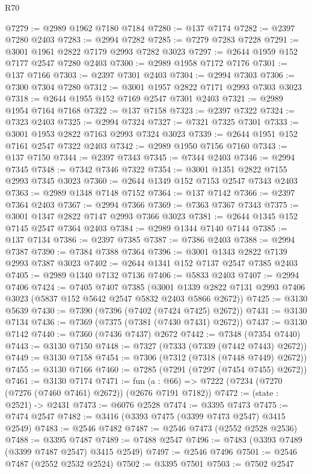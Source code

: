 \begin{lexlean}{R70}
\begin{coremodule}
@7279 := @2989 @1962 @7180 @7184
@7280 := @137 @7174
@7282 := @2397 @7280 @2403
@7283 := @2994 @7282
@7285 := @7279 @7283 @7228
@7291 := @3001 @1961 @2822 @7179 @2993 @7282 @3023
@7297 := @2644 @1959 @152 @7177 @2547 @7280 @2403
@7300 := @2989 @1958 @7172 @7176
@7301 := @137 @7166
@7303 := @2397 @7301 @2403
@7304 := @2994 @7303
@7306 := @7300 @7304 @7280
@7312 := @3001 @1957 @2822 @7171 @2993 @7303 @3023
@7318 := @2644 @1955 @152 @7169 @2547 @7301 @2403
@7321 := @2989 @1954 @7164 @7168
@7322 := @137 @7158
@7323 := @2397 @7322
@7324 := @7323 @2403
@7325 := @2994 @7324
@7327 := @7321 @7325 @7301
@7333 := @3001 @1953 @2822 @7163 @2993 @7324 @3023
@7339 := @2644 @1951 @152 @7161 @2547 @7322 @2403
@7342 := @2989 @1950 @7156 @7160
@7343 := @137 @7150
@7344 := @2397 @7343
@7345 := @7344 @2403
@7346 := @2994 @7345
@7348 := @7342 @7346 @7322
@7354 := @3001 @1351 @2822 @7155 @2993 @7345 @3023
@7360 := @2644 @1349 @152 @7153 @2547 @7343 @2403
@7363 := @2989 @1348 @7148 @7152
@7364 := @137 @7142
@7366 := @2397 @7364 @2403
@7367 := @2994 @7366
@7369 := @7363 @7367 @7343
@7375 := @3001 @1347 @2822 @7147 @2993 @7366 @3023
@7381 := @2644 @1345 @152 @7145 @2547 @7364 @2403
@7384 := @2989 @1344 @7140 @7144
@7385 := @137 @7134
@7386 := @2397 @7385
@7387 := @7386 @2403
@7388 := @2994 @7387
@7390 := @7384 @7388 @7364
@7396 := @3001 @1343 @2822 @7139 @2993 @7387 @3023
@7402 := @2644 @1341 @152 @7137 @2547 @7385 @2403
@7405 := @2989 @1340 @7132 @7136
@7406 := @5833 @2403
@7407 := @2994 @7406
@7424 := @7405
    @7407
    @7385
    (@3001 @1339 @2822 @7131 @2993 @7406 @3023 (@5837 @152 @5642 @2547 @5832 @2403 @5866 @2672))
@7425 := @3130 @5639
@7430 := @7390 (@7396 (@7402 (@7424 @7425) @2672))
@7431 := @3130 @7134
@7436 := @7369 (@7375 (@7381 (@7430 @7431) @2672))
@7437 := @3130 @7142
@7440 := @7360 (@7436 @7437) @2672
@7442 := @7348 (@7354 @7440)
@7443 := @3130 @7150
@7448 := @7327 (@7333 (@7339 (@7442 @7443) @2672))
@7449 := @3130 @7158
@7454 := @7306 (@7312 (@7318 (@7448 @7449) @2672))
@7455 := @3130 @7166
@7460 := @7285 (@7291 (@7297 (@7454 @7455) @2672))
@7461 := @3130 @7174
@7471 := fun (a : @66) => @7222 (@7234 (@7270 (@7276 (@7460 @7461) @2672)) (@2676 @7191 @7182))
@7472 := (state : @2521) -> @2431
@7473 := @6076 @2528
@7474 := @3395 @7473
@7475 := @7474 @2547
@7482 := @3416 (@3393 @7475 (@3399 @7473 @2547) @3415 @2549)
@7483 := @2546 @7482
@7487 := @2546 @7473 (@2552 @2528 @2536)
@7488 := @3395 @7487
@7489 := @7488 @2547
@7496 := @7483 (@3393 @7489 (@3399 @7487 @2547) @3415 @2549)
@7497 := @2546 @7496
@7501 := @2546 @7487 (@2552 @2532 @2524)
@7502 := @3395 @7501
@7503 := @7502 @2547

\end{coremodule}
\end{lexlean}
